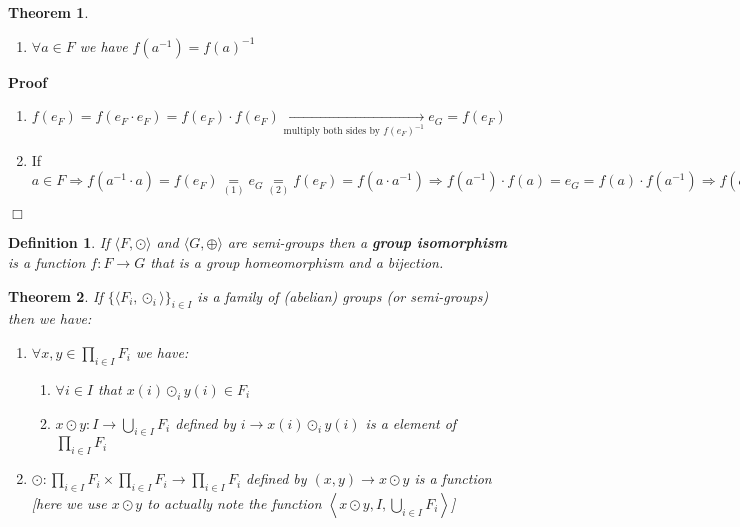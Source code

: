\documentclass{book}
\newcommand{\Rightarrowlim}{\mathop{\rightarrow}\limits}
\newcommand{\equallim}{\mathop{=}\limits}
\newcommand{\tmtextbf}[1]{{\bfseries{#1}}}
\newenvironment{proof}{\noindent\textbf{Proof\ }}{\hspace*{\fill}$\Box$\medskip}
\newtheorem{definition}{Definition}
{\theorembodyfont{\rmfamily}\newtheorem{example}{Example}}
\newtheorem{theorem}{Theorem}
\begin{document}
{{\begin{theorem}
\begin{enumerate}
    \item $\forall a \in F$ we have $f (a^{- 1}) = f (a)^{- 1}$
  \end{enumerate}
\end{theorem}

\begin{proof}
  
  \begin{enumerate}
    \item $f (e_F) = f (e_F \cdot e_F) = f (e_F) \cdot f (e_F)
    \Rightarrowlim_{\text{multiply both sides by $f (e_F)^{- 1}$}} e_G = f
    (e_F)$
    
    \item If $a \in F \Rightarrow f (a^{- 1} \cdot a) = f (e_F)
    \equallim_{(1)} e_G \equallim_{(2)} f (e_F) = f (a \cdot a^{- 1})
    \Rightarrow f (a^{- 1}) \cdot f (a) = e_G = f (a) \cdot f (a^{- 1})
    \Rightarrow f (a^{- 1}) = f (a)^{- 1}$
  \end{enumerate}
\end{proof}

\begin{definition}
  \label{group ismorphism}{}If $\langle F, \odot
  \rangle$ and $\langle G, \oplus \rangle$ are semi-groups then a
  \tmtextbf{group isomorphism} is a function $f : F \rightarrow G$ that is a
  group homeomorphism and a bijection.
\end{definition}

\begin{theorem}
  \label{product of a family of groups}If $\{ \langle F_i, \odot_i \rangle
  \}_{i \in I}$ is a family of (abelian) groups (or semi-groups) then we have:
  \begin{enumerate}
    \item $\forall x, y \in \prod_{i \in I} F_i$ we have:
    \begin{enumerate}
      \item $\forall i \in I$ that $x (i) \odot_i y (i) \in F_i$
      
      \item $x \odot y : I \rightarrow \bigcup_{i \in I} F_i$ defined by $i
      \rightarrow x (i) \odot_i y (i)$ is a element of $\prod_{i \in I} F_i$
    \end{enumerate}
    \item $\odot : \prod_{i \in I} F_i \times \prod_{i \in I} F_i \rightarrow
    \prod_{i \in I} F_i$ defined by $(x, y) \rightarrow x \odot y$ is a
    function [here we use $x \odot y$ to actually note the function
    $\left\langle x \odot y, I, \bigcup_{i \in I} F_i \right\rangle$]
    

\end{enumerate}
\end{theorem}}}
\end{document}
